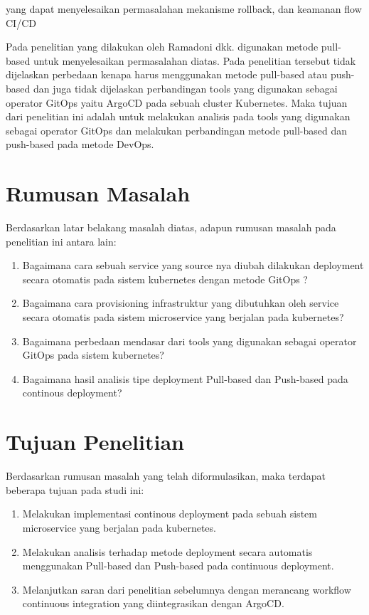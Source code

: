 yang dapat menyelesaikan permasalahan mekanisme rollback, dan keamanan flow CI/CD
\par
Pada penelitian yang dilakukan oleh Ramadoni dkk. \cite{Ramadoni2021} digunakan metode pull-based untuk menyelesaikan permasalahan diatas. Pada penelitian tersebut tidak
dijelaskan perbedaan kenapa harus menggunakan metode pull-based atau push-based dan juga tidak dijelaskan
perbandingan tools yang digunakan sebagai operator GitOps yaitu ArgoCD pada sebuah cluster Kubernetes.
Maka tujuan dari penelitian ini adalah untuk melakukan analisis pada tools yang digunakan
sebagai operator GitOps dan melakukan perbandingan metode pull-based dan push-based pada metode DevOps.
\vspace{0.5cm}
\section{Rumusan Masalah}
Berdasarkan latar belakang masalah diatas, adapun rumusan masalah pada penelitian ini antara lain:
\begin{enumerate}[label=\alph*.]
    \item Bagaimana cara sebuah service yang source nya diubah dilakukan  deployment secara otomatis pada sistem kubernetes dengan metode GitOps ?
    \item Bagaimana cara provisioning infrastruktur yang dibutuhkan oleh service  secara otomatis pada sistem microservice yang berjalan pada kubernetes?
    \item Bagaimana perbedaan mendasar dari tools yang digunakan sebagai operator GitOps pada sistem kubernetes?
    \item Bagaimana hasil analisis tipe deployment Pull-based dan Push-based pada continous deployment?
\end{enumerate}

\vspace{0.5cm}
\section{Tujuan Penelitian}
Berdasarkan rumusan masalah yang telah diformulasikan, maka terdapat beberapa tujuan pada studi ini:
\begin{enumerate}[label=\alph*.]
    \item Melakukan implementasi continous deployment pada sebuah sistem microservice yang berjalan pada kubernetes.
    \item Melakukan analisis terhadap metode deployment secara automatis menggunakan Pull-based dan Push-based pada continuous deployment.
    \item Melanjutkan saran dari penelitian sebelumnya \cite{Ramadoni2021} dengan merancang  workflow continuous integration yang diintegrasikan dengan ArgoCD.
\end{enumerate}
\vspace{0.5cm}
